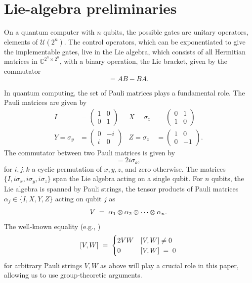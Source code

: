 \documentclass[12pt, a4-paper]{amsart}
\newcommand{\cU}{\mathcal{U}}
\newcommand{\C}{\mathbb{C}}
\numberwithin{equation}{section}
\newcommand{\lel}{\pl = \pl}
\newcommand{\pl}{\hspace{.1cm}}
\begin{document}
\section{Lie-algebra preliminaries}\label{sec:math_prelim}

On a quantum computer with $n$ qubits, the possible gates are unitary operators, elements of $\cU(2^n)$. The control operators, which can be exponentiated to give the implementable gates, live in the Lie algebra, which consists of all Hermitian matrices in $\C^{2^n \times 2^n}$, with a binary operation, the Lie bracket, given by the commutator
\begin{equation}
    [A,B] = AB - BA.
\end{equation}

In quantum computing, the set of Pauli matrices plays a fundamental role. The Pauli matrices are given by 
\begin{equation}
\begin{aligned}
        I & = \begin{pmatrix}
        1 & 0 \\0 & 1
    \end{pmatrix} & X = \sigma_x & = \begin{pmatrix}
        0 & 1 \\1 & 0
    \end{pmatrix} \\
    Y = \sigma_y & = \begin{pmatrix}
        0 & -i \\i & 0
    \end{pmatrix} & Z = \sigma_z  & = \begin{pmatrix}
        1 & 0 \\0 & -1
    \end{pmatrix}.
\end{aligned}
\end{equation}
The commutator between two Pauli matrices is given by 
\begin{equation}
    [\sigma_i, \sigma_j] = 2 i \sigma_k,
\end{equation}
for $i, j, k$ a cyclic permutation of $x, y, z$, and zero otherwise. The matrices $\{I, i\sigma_x, i\sigma_y, i\sigma_z\}$ span the Lie algebra acting on a single qubit. For $n$ qubits, the Lie algebra is spanned by Pauli strings, the tensor products of Pauli matrices $\alpha_j \in \{I,X,Y,Z\}$ acting on qubit $j$ as
\begin{equation}
    V\lel  \alpha_1 \otimes \alpha_2 \otimes \cdots \otimes \alpha_n.
\end{equation}
The well-known equality (e.g., \cite{Aguilar2024FullClassificationLie})
\begin{equation}\label{comP}
  [V,W] \lel \begin{cases} 2VW & [V,W]\neq 0 \\ 
                              0 & [V,W] \lel 0 \end{cases} 
                              \end{equation}
 for arbitrary Pauli strings $V,W$ as above will play a crucial role in this paper, allowing us to use group-theoretic arguments. 
 
\end{document}
